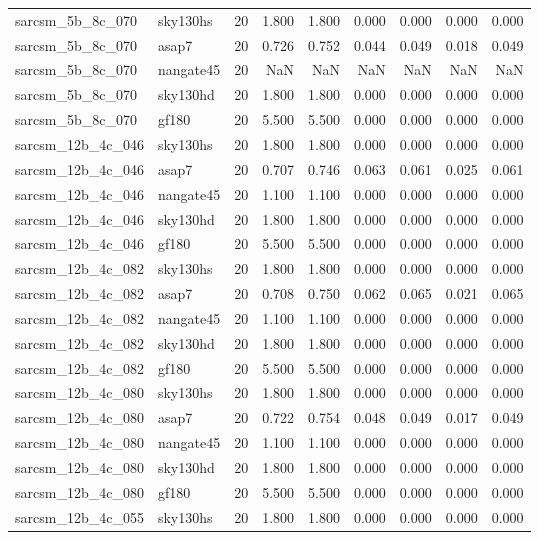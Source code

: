 \begin{tabular}{llrrrrrrr}
sarcsm\_5b\_8c\_070 & sky130hs & 20 & 1.800 & 1.800 & 0.000 & 0.000 & 0.000 & 0.000 \\
sarcsm\_5b\_8c\_070 & asap7 & 20 & 0.726 & 0.752 & 0.044 & 0.049 & 0.018 & 0.049 \\
sarcsm\_5b\_8c\_070 & nangate45 & 20 & NaN & NaN & NaN & NaN & NaN & NaN \\
sarcsm\_5b\_8c\_070 & sky130hd & 20 & 1.800 & 1.800 & 0.000 & 0.000 & 0.000 & 0.000 \\
sarcsm\_5b\_8c\_070 & gf180 & 20 & 5.500 & 5.500 & 0.000 & 0.000 & 0.000 & 0.000 \\
sarcsm\_12b\_4c\_046 & sky130hs & 20 & 1.800 & 1.800 & 0.000 & 0.000 & 0.000 & 0.000 \\
sarcsm\_12b\_4c\_046 & asap7 & 20 & 0.707 & 0.746 & 0.063 & 0.061 & 0.025 & 0.061 \\
sarcsm\_12b\_4c\_046 & nangate45 & 20 & 1.100 & 1.100 & 0.000 & 0.000 & 0.000 & 0.000 \\
sarcsm\_12b\_4c\_046 & sky130hd & 20 & 1.800 & 1.800 & 0.000 & 0.000 & 0.000 & 0.000 \\
sarcsm\_12b\_4c\_046 & gf180 & 20 & 5.500 & 5.500 & 0.000 & 0.000 & 0.000 & 0.000 \\
sarcsm\_12b\_4c\_082 & sky130hs & 20 & 1.800 & 1.800 & 0.000 & 0.000 & 0.000 & 0.000 \\
sarcsm\_12b\_4c\_082 & asap7 & 20 & 0.708 & 0.750 & 0.062 & 0.065 & 0.021 & 0.065 \\
sarcsm\_12b\_4c\_082 & nangate45 & 20 & 1.100 & 1.100 & 0.000 & 0.000 & 0.000 & 0.000 \\
sarcsm\_12b\_4c\_082 & sky130hd & 20 & 1.800 & 1.800 & 0.000 & 0.000 & 0.000 & 0.000 \\
sarcsm\_12b\_4c\_082 & gf180 & 20 & 5.500 & 5.500 & 0.000 & 0.000 & 0.000 & 0.000 \\
sarcsm\_12b\_4c\_080 & sky130hs & 20 & 1.800 & 1.800 & 0.000 & 0.000 & 0.000 & 0.000 \\
sarcsm\_12b\_4c\_080 & asap7 & 20 & 0.722 & 0.754 & 0.048 & 0.049 & 0.017 & 0.049 \\
sarcsm\_12b\_4c\_080 & nangate45 & 20 & 1.100 & 1.100 & 0.000 & 0.000 & 0.000 & 0.000 \\
sarcsm\_12b\_4c\_080 & sky130hd & 20 & 1.800 & 1.800 & 0.000 & 0.000 & 0.000 & 0.000 \\
sarcsm\_12b\_4c\_080 & gf180 & 20 & 5.500 & 5.500 & 0.000 & 0.000 & 0.000 & 0.000 \\
sarcsm\_12b\_4c\_055 & sky130hs & 20 & 1.800 & 1.800 & 0.000 & 0.000 & 0.000 & 0.000 \\

\end{tabular}
